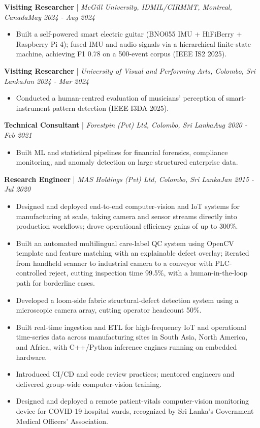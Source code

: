 \documentclass[11pt]{article}
\newenvironment{cvrole}[5]{%
  \par\noindent\textbf{\large #1} | \textit{\small #2, #3}\hfill \textit{\small #4 - #5}\par
  \begin{itemize}[leftmargin=2em, itemsep=-0.3em, topsep=-0.5em]%
}{%
  \end{itemize}\par\noindent\mbox{}\par\vspace{0.1em}%
}
\begin{document}
\begin{cvrole}{Visiting Researcher}{McGill University, IDMIL/CIRMMT}{Montreal, Canada}{May 2024}{Aug 2024}
\item Built a self-powered smart electric guitar (BNO055 IMU + HiFiBerry + Raspberry Pi 4); fused IMU and audio signals via a hierarchical finite-state machine, achieving F1 0.78 on a 500-event corpus (IEEE IS2 2025).
\end{cvrole}

\begin{cvrole}{Visiting Researcher}{University of Visual and Performing Arts}{Colombo, Sri Lanka}{Jan 2024}{Mar 2024}
\item Conducted a human-centred evaluation of musicians' perception of smart-instrument pattern detection (IEEE I3DA 2025).
\end{cvrole}

\begin{cvrole}{Technical Consultant}{Forestpin (Pvt) Ltd}{Colombo, Sri Lanka}{Aug 2020}{Feb 2021}
\item Built ML and statistical pipelines for financial forensics, compliance monitoring, and anomaly detection on large structured enterprise data.
\end{cvrole}

\begin{cvrole}{Research Engineer}{MAS Holdings (Pvt) Ltd}{Colombo, Sri Lanka}{Jan 2015}{Jul 2020}
\item Designed and deployed end-to-end computer-vision and IoT systems for manufacturing at scale, taking camera and sensor streams directly into production workflows; drove operational efficiency gains of up to 300\%.
\item Built an automated multilingual care-label QC system using OpenCV template and feature matching with an explainable defect overlay; iterated from handheld scanner to industrial camera to a conveyor with PLC-controlled reject, cutting inspection time 99.5\%, with a human-in-the-loop path for borderline cases.
\item Developed a loom-side fabric structural-defect detection system using a microscopic camera array, cutting operator headcount 50\%.
\item Built real-time ingestion and ETL for high-frequency IoT and operational time-series data across manufacturing sites in South Asia, North America, and Africa, with C++/Python inference engines running on embedded hardware.
\item Introduced CI/CD and code review practices; mentored engineers and delivered group-wide computer-vision training.
\item Designed and deployed a remote patient-vitals computer-vision monitoring device for COVID-19 hospital wards, recognized by Sri Lanka's Government Medical Officers' Association.
\end{cvrole}
\end{document}
